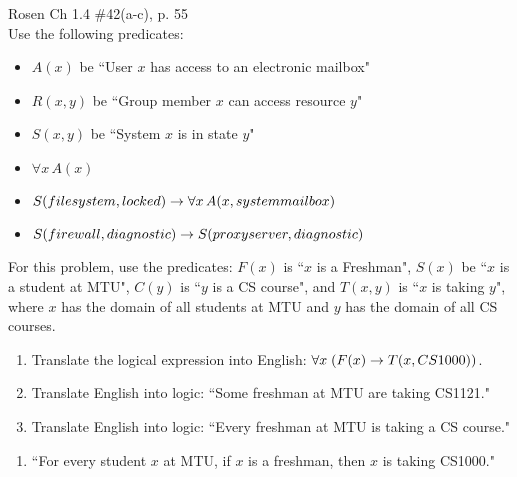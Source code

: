 \begin{questions}
 Rosen Ch 1.4 \#42(a-c), p. 55\\
Use the following predicates:
  \begin{itemize}[itemsep=0pt,parsep=0pt,topsep=0pt,partopsep=0pt]
    \item $A(x)$ be ``User $x$ has access to an electronic mailbox"
    \item $R(x,y)$ be ``Group member $x$ can access resource $y$"
    \item $S(x,y)$ be ``System $x$ is in state $y$"
  \end{itemize}
    \ifprintanswers
        \vspace{-12pt}
    \fi
  \begin{solution}
    \begin{itemize}[itemsep=0pt,parsep=0pt,topsep=0pt,partopsep=0pt]
      \item $\forall x\, A(x)$
      \item $S(file system, locked) \rightarrow  \forall x\, A(x, system mailbox)$
      \item $S(firewall, diagnostic) \rightarrow S(proxy server, diagnostic)$
    \end{itemize}
  \end{solution}



\label{proba} For this problem, use the predicates: $F(x)$ is ``$x$ is a Freshman", $S(x)$ be ``$x$ is a student at MTU", $C(y)$ is ``$y$ is a CS course", and $T(x,y)$ is ``$x$ is taking $y$", where $x$ has the domain of all students at MTU and $y$ has the domain of all CS courses.
\begin{enumerate}[label=(\alph*),itemsep=0pt,parsep=0pt,
  topsep=0pt,partopsep=0pt]
    \item Translate the logical expression into English: $\forall x\; (F(x) \rightarrow T(x,CS1000))$.
    \item Translate English into logic: ``Some freshman at MTU are taking CS1121."
    \item Translate English into logic: ``Every freshman at MTU is taking a CS course."
\end{enumerate}
    \ifprintanswers
        \vspace{-12pt}
    \fi
\begin{solution}
    \begin{enumerate}[label=(\alph*),itemsep=0pt,parsep=0pt,
      topsep=0pt,partopsep=0pt]
        \item ``For every student $x$ at MTU, if $x$ is a freshman, then $x$ is taking CS1000."


\end{enumerate}
\end{solution}
\end{questions}
